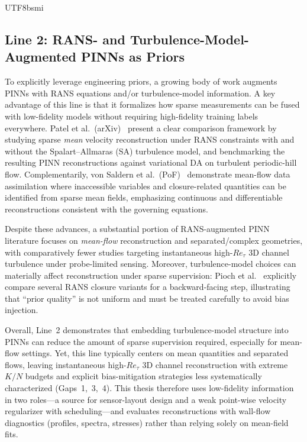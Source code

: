 \documentclass[master]{NTHUthesis}
\begin{document}
\begin{CJK*}{UTF8}{bsmi}
\subsection{Line 2: RANS- and Turbulence-Model-Augmented PINNs as Priors}
\label{sec:lit_line2_rans}

To explicitly leverage engineering priors, a growing body of work augments PINNs with RANS equations and/or turbulence-model information. A key advantage of this line is that it formalizes how sparse measurements can be fused with low-fidelity models without requiring high-fidelity training labels everywhere. Patel et al.\ (arXiv)~\cite{patel2024turbulencemodelaugmentedphysics} present a clear comparison framework by studying sparse \emph{mean} velocity reconstruction under RANS constraints with and without the Spalart--Allmaras (SA) turbulence model, and benchmarking the resulting PINN reconstructions against variational DA on turbulent periodic-hill flow. Complementarily, von Saldern et al.\ (PoF)~\cite{von_Saldern_2022} demonstrate mean-flow data assimilation where inaccessible variables and closure-related quantities can be identified from sparse mean fields, emphasizing continuous and differentiable reconstructions consistent with the governing equations.

Despite these advances, a substantial portion of RANS-augmented PINN literature focuses on \emph{mean-flow} reconstruction and separated/complex geometries, with comparatively fewer studies targeting instantaneous high-$Re_\tau$ 3D channel turbulence under probe-limited sensing. Moreover, turbulence-model choices can materially affect reconstruction under sparse supervision: Pioch et al.~\cite{fluids8020043} explicitly compare several RANS closure variants for a backward-facing step, illustrating that ``prior quality'' is not uniform and must be treated carefully to avoid bias injection.

Overall, Line~2 demonstrates that embedding turbulence-model structure into PINNs can reduce the amount of sparse supervision required, especially for mean-flow settings. Yet, this line typically centers on mean quantities and separated flows, leaving instantaneous high-$Re_\tau$ 3D channel reconstruction with extreme $K/N$ budgets and explicit bias-mitigation strategies less systematically characterized (Gaps~1,~3,~4). This thesis therefore uses low-fidelity information in two roles---a source for sensor-layout design and a weak point-wise velocity regularizer with scheduling---and evaluates reconstructions with wall-flow diagnostics (profiles, spectra, stresses) rather than relying solely on mean-field fits.


\end{CJK*}
\end{document}
